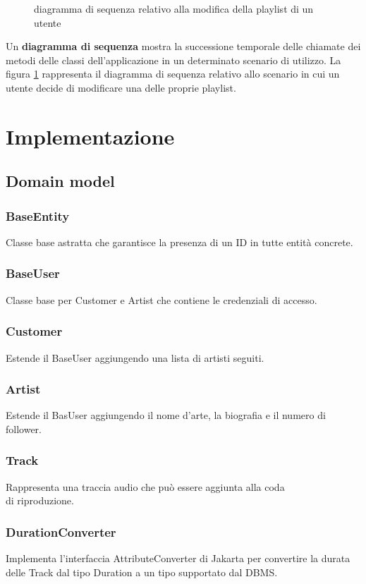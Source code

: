 \documentclass{article}
\begin{document}
  \begin{figure}[H]
    \centering
    
    \caption{diagramma di sequenza relativo alla modifica della playlist di un utente}
    \label{fig:seqDiag}
  \end{figure}

  Un \textbf{diagramma di sequenza} mostra la successione temporale delle chiamate dei metodi delle classi dell'applicazione in un determinato scenario di utilizzo. La figura \ref{fig:seqDiag} rappresenta il diagramma di sequenza relativo allo scenario in cui un utente decide di modificare una delle proprie playlist.


  \section{Implementazione}

  \subsection{Domain model}

  \subsubsection{BaseEntity}
  Classe base astratta che garantisce la presenza di un ID in tutte entità concrete.
  \subsubsection{BaseUser}
  Classe base per Customer e Artist che contiene le credenziali di accesso.
  \subsubsection{Customer}
  Estende il BaseUser aggiungendo una lista di artisti seguiti.
  \subsubsection{Artist}
  Estende il BasUser aggiungendo il nome d'arte, la biografia e il numero di follower.
  \subsubsection{Track}
  Rappresenta una traccia audio che può essere aggiunta alla coda\\ di riproduzione.

  \subsubsection{DurationConverter}
  Implementa l'interfaccia AttributeConverter di Jakarta per convertire la durata delle Track dal tipo Duration a un tipo supportato dal DBMS.
\end{document}
